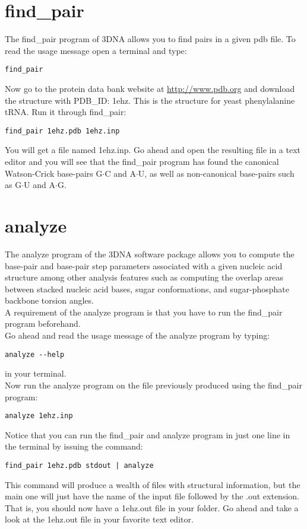 \section{find\_pair}
The \textrm{find\_pair} program of 3DNA  allows you to find pairs in a
given pdb file.
To read the usage message open a terminal and type:
\begin{Verbatim}
find_pair
\end{Verbatim} 
Now go  to the protein data bank website  at \url{http://www.pdb.org}
and download the  structure with PDB\_ID: 1ehz. This  is the structure
for yeast phenylalanine tRNA.
Run it through \textrm{find\_pair}:
\begin{Verbatim}
find_pair 1ehz.pdb 1ehz.inp
\end{Verbatim}
You will  get a file named  1ehz.inp. Go ahead and  open the resulting
file in  a text editor and  you will see  that the \textrm{find\_pair}
program has found the  canonical Watson-Crick base-pairs G$\cdot$C and
A$\cdot$U, as  well as non-canonical base-pairs such  as G$\cdot$U and
A$\cdot$G.

\section{analyze}
The \textrm{analyze}  program of the 3DNA software  package allows you
to compute the base-pair and  base-pair step parameters associated with a
given nucleic  acid structure among  other analysis features  such as
computing the overlap areas  between stacked nucleic acid bases, sugar
conformations, and sugar-phosphate backbone torsion angles.\\
A requirement of the \textrm{analyze} program is that you have to run the
\textrm{find\_pair} program beforehand.\\
Go ahead and read the usage message of the analyze program by typing:
\begin{Verbatim}
analyze --help
\end{Verbatim}
in your terminal.\\

\noindent Now run the analyze  program on the file previously produced
using the \textrm{find\_pair} program:
\begin{Verbatim}
analyze 1ehz.inp
\end{Verbatim}
Notice that  you can run the  \textrm{find\_pair} and \textrm{analyze}
program in just one line in the terminal by issuing the command:
\begin{Verbatim}
find_pair 1ehz.pdb stdout | analyze
\end{Verbatim}
This  command   will  produce  a  wealth  of   files  with  structural
information, but  the main one  will just have  the name of  the input
file followed  by the .out extension.  That is, you should  now have a
1ehz.out file in your folder. Go ahead and take a look at the 1ehz.out
file in your favorite text editor.

